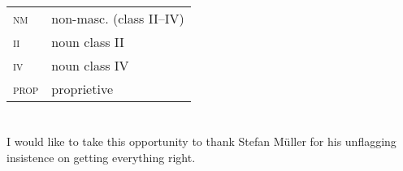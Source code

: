 \documentclass[output=paper,biblatex,babelshorthands,newtxmath,draftmode,colorlinks,citecolor=brown]{langscibook}
\begin{document}
\begin{tabularx}{.99\textwidth}{@{}lX}
\textsc{nm}   & non-masc. (class II--IV)\\
\textsc{ii}   & noun class II\\
\textsc{iv}   & noun class IV\\
\textsc{prop} & proprietive\\
\end{tabularx}


\section*{\acknowledgmentsEN}

I would like to take this opportunity to thank Stefan Müller for his unflagging insistence on getting everything right. 

{\sloppy
\printbibliography[heading=subbibliography,notkeyword=this] 
}
\end{document}
